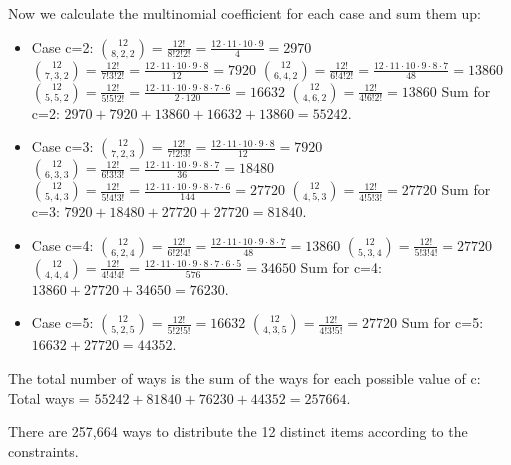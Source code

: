 \documentclass{report}
\begin{document}
{Now we calculate the multinomial coefficient for each case and sum them up:
\begin{itemize}
    \item Case c=2:
    $\binom{12}{8,2,2} = \frac{12!}{8!2!2!} = \frac{12 \cdot 11 \cdot 10 \cdot 9}{4} = 2970$
    $\binom{12}{7,3,2} = \frac{12!}{7!3!2!} = \frac{12 \cdot 11 \cdot 10 \cdot 9 \cdot 8}{12} = 7920$
    $\binom{12}{6,4,2} = \frac{12!}{6!4!2!} = \frac{12 \cdot 11 \cdot 10 \cdot 9 \cdot 8 \cdot 7}{48} = 13860$
    $\binom{12}{5,5,2} = \frac{12!}{5!5!2!} = \frac{12 \cdot 11 \cdot 10 \cdot 9 \cdot 8 \cdot 7 \cdot 6}{2 \cdot 120} = 16632$
    $\binom{12}{4,6,2} = \frac{12!}{4!6!2!} = 13860$
    Sum for c=2: $2970 + 7920 + 13860 + 16632 + 13860 = 55242$.

    \item Case c=3:
    $\binom{12}{7,2,3} = \frac{12!}{7!2!3!} = \frac{12 \cdot 11 \cdot 10 \cdot 9 \cdot 8}{12} = 7920$
    $\binom{12}{6,3,3} = \frac{12!}{6!3!3!} = \frac{12 \cdot 11 \cdot 10 \cdot 9 \cdot 8 \cdot 7}{36} = 18480$
    $\binom{12}{5,4,3} = \frac{12!}{5!4!3!} = \frac{12 \cdot 11 \cdot 10 \cdot 9 \cdot 8 \cdot 7 \cdot 6}{144} = 27720$
    $\binom{12}{4,5,3} = \frac{12!}{4!5!3!} = 27720$
    Sum for c=3: $7920 + 18480 + 27720 + 27720 = 81840$.

    \item Case c=4:
    $\binom{12}{6,2,4} = \frac{12!}{6!2!4!} = \frac{12 \cdot 11 \cdot 10 \cdot 9 \cdot 8 \cdot 7}{48} = 13860$
    $\binom{12}{5,3,4} = \frac{12!}{5!3!4!} = 27720$
    $\binom{12}{4,4,4} = \frac{12!}{4!4!4!} = \frac{12 \cdot 11 \cdot 10 \cdot 9 \cdot 8 \cdot 7 \cdot 6 \cdot 5}{576} = 34650$
    Sum for c=4: $13860 + 27720 + 34650 = 76230$.

    \item Case c=5:
    $\binom{12}{5,2,5} = \frac{12!}{5!2!5!} = 16632$
    $\binom{12}{4,3,5} = \frac{12!}{4!3!5!} = 27720$
    Sum for c=5: $16632 + 27720 = 44352$.
\end{itemize}

The total number of ways is the sum of the ways for each possible value of c:
Total ways = $55242 + 81840 + 76230 + 44352 = 257664$.

There are 257,664 ways to distribute the 12 distinct items according to the constraints.
}
\end{document}
